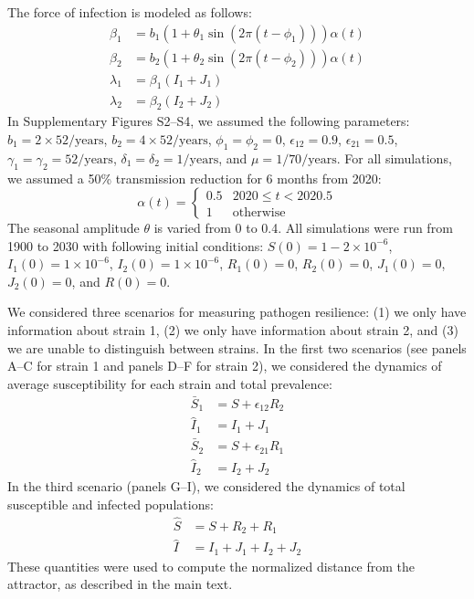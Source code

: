 \documentclass[12pt]{article}
\begin{document}
The force of infection is modeled as follows:
\begin{align}
\beta_1 &= b_1 (1 + \theta_1 \sin(2 \pi (t-\phi_1))) \alpha(t)\\
\beta_2 &= b_2 (1 + \theta_2 \sin(2 \pi (t-\phi_2))) \alpha(t)\\
\lambda_1 &= \beta_1 (I_1 + J_1)\\
\lambda_2 &= \beta_2 (I_2 + J_2)
\end{align}
In Supplementary Figures S2--S4, we assumed the following parameters:
$b_1 = 2 \times 52/\mathrm{years}$, $b_2 = 4 \times 52/\mathrm{years}$, $\phi_1 = \phi_2 = 0$, $\epsilon_{12} = 0.9$, $\epsilon_{21} = 0.5$,
$\gamma_1 = \gamma_2 = 52/\mathrm{years}$, $\delta_1 = \delta_2 = 1/\mathrm{years}$, and $\mu=1/70/\mathrm{years}$.
For all simulations, we assumed a 50\% transmission reduction for 6 months from 2020:
\begin{equation}
\alpha(t) = \begin{cases}
0.5 & 2020 \leq t< 2020.5\\
1 & \textrm{otherwise}
\end{cases}
\end{equation}
The seasonal amplitude $\theta$ is varied from 0 to 0.4.
All simulations were run from 1900 to 2030 with following initial conditions: 
$S(0) = 1 - 2\times 10^{-6}$, $I_1(0) = 1 \times 10^{-6}$, $I_2(0) = 1 \times 10^{-6}$, $R_1(0) = 0$, $R_2(0) = 0$, $J_1(0) = 0$, $J_2(0) = 0$, and $R(0) = 0$.

We considered three scenarios for measuring pathogen resilience: (1) we only have information about strain 1, (2) we only have information about strain 2, and (3) we are unable to distinguish between strains.
In the first two scenarios (see panels A--C for strain 1 and panels D--F for strain 2), we considered the dynamics of average susceptibility for each strain and total prevalence:
\begin{align}
\bar{S}_1 &= S + \epsilon_{12} R_2\\
\hat{I}_1 &= I_1 + J_1\\
\bar{S}_2 &= S + \epsilon_{21} R_1\\
\hat{I}_2 &= I_2 + J_2
\end{align}
In the third scenario (panels G--I), we considered the dynamics of total susceptible and infected populations:
\begin{align}
\hat{S} &= S + R_2 + R_1\\
\hat{I} &= I_1 + J_1 + I_2 + J_2
\end{align}
These quantities were used to compute the normalized distance from the attractor, as described in the main text.
\end{document}
